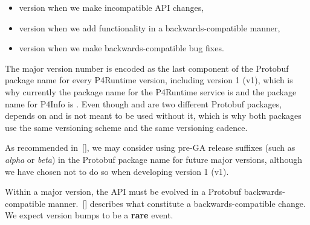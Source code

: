 \documentclass[11pt]{article}
\begin{document}
{%
\begin{itemize}[noitemsep,topsep=\mdcompacttopsep]%

\item{} version when we make incompatible API changes,%

\item{} version when we add functionality in a backwards-compatible manner,%

\item{} version when we make backwards-compatible bug fixes.%
\end{itemize}%

\noindent{}The major version number is encoded as the last component of the Protobuf
package name for every P4Runtime version, including version 1 (v1), which is why
currently the package name for the P4Runtime service is  and the package
name for P4Info is . Even though  and  are two
different Protobuf packages,  depends on  and is not meant to be
used without it, which is why both packages use the same versioning scheme and
the same versioning cadence.%

As recommended in~[], we may consider using pre-GA release
suffixes (such as \emph{alpha} or \emph{beta}) in the Protobuf package name for future
major versions, although we have chosen not to do so when developing version 1
(v1).%

Within a major version, the API must be evolved in a Protobuf
backwards-compatible manner.~[] describes
what constitute a backwards-compatible change. We expect  version bumps
to be a \textbf{rare} event.%

}
\end{document}
